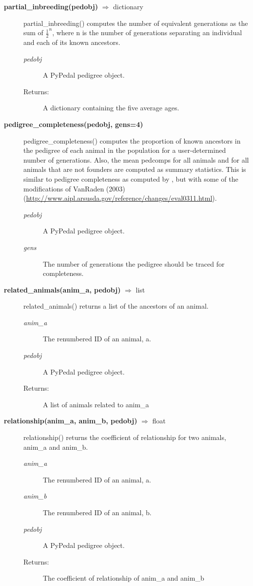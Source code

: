 \begin{description}
\item[\textbf{partial\_inbreeding(pedobj)} $\Rightarrow$ dictionary]
partial\_inbreeding() computes the number of equivalent generations as the sum of $\frac{1}{2}^{n}$, where n is the number of generations separating an individual and each of its known ancestors.
\begin{description}
\item[\emph{pedobj}] A PyPedal pedigree object.
\item[Returns:] A dictionary containing the five average ages.
\end{description}

\item[\textbf{pedigree\_completeness(pedobj, gens=4)}]
pedigree\_completeness() computes the proportion of known ancestors in the pedigree of each animal in the population for a user-determined number of generations. Also, the mean pedcomps for all animals and for all animals that are not founders are computed as summary statistics.  This is similar to pedigree completeness as computed by , but with some of the modifications of VanRaden (2003) (\url{http://www.aipl.arsusda.gov/reference/changes/eval0311.html}).
\begin{description}
\item[\emph{pedobj}] A PyPedal pedigree object.
\item[\emph{gens}] The number of generations the pedigree should be traced for completeness.
\end{description}

\item[\textbf{related\_animals(anim\_a, pedobj)} $\Rightarrow$ list]
related\_animals() returns a list of the ancestors of an animal.
\begin{description}
\item[\emph{anim\_a}] The renumbered ID of an animal, a.
\item[\emph{pedobj}] A PyPedal pedigree object.
\item[Returns:] A list of animals related to anim\_a
\end{description}

\item[\textbf{relationship(anim\_a, anim\_b, pedobj)} $\Rightarrow$ float]
relationship() returns the coefficient of relationship for two animals, anim\_a and anim\_b.
\begin{description}
\item[\emph{anim\_a}] The renumbered ID of an animal, a.
\item[\emph{anim\_b}] The renumbered ID of an animal, b.
\item[\emph{pedobj}] A PyPedal pedigree object.
\item[Returns:] The coefficient of relationship of anim\_a and anim\_b
\end{description}


\end{description}
